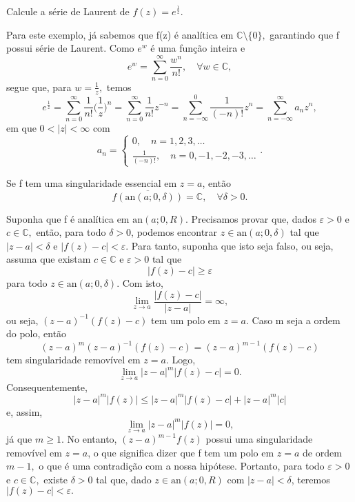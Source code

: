 \documentclass[ComplexAnalysis/complex.tex]{subfiles}
\begin{document}
\begin{example}
	Calcule a série de Laurent de \(f(z) = e^{\frac{1}{z}}.\)

	Para este exemplo, já sabemos que f(z) é analítica em \(\mathbb{C}\setminus{\{0\}},\) garantindo que f possui série de Laurent.
	Como \(e^{w}\) é uma função inteira e
	\[
		e^{w} = \sum\limits_{n=0}^{\infty}\frac{w^{n}}{n!},\quad \forall w\in \mathbb{C},
	\]
	segue que, para \(w = \frac{1}{z},\) temos
	\[
		e^{\frac{1}{z}}=\sum\limits_{n=0}^{\infty}\frac{1}{n!}\biggl(\frac{1}{z}\biggr)^{n} = \sum\limits_{n=0}^{\infty}\frac{1}{n!}z^{-n} = \sum\limits_{n=-\infty}^{0}\frac{1}{(-n)!}z^{n} = \sum\limits_{n=-\infty}^{\infty}a_{n}z^{n},
	\]
	em que \(0 < |z| < \infty\) com
	\[
		a_{n}  = \left\{\begin{array}{ll}
			0,\quad n=1, 2, 3,\dotsc \\
			\frac{1}{(-n)!},\quad n = 0, -1, -2, -3, \dotsc
		\end{array}\right. .
	\]
\end{example}
\hypertarget{casorati-weierstrass}{
	\begin{theorem*}
		Se f tem uma singularidade essencial em \(z=a\), então
		\[
			\overline{f(\mathrm{an}(a; 0, \delta ))} = \mathbb{C},\quad \forall \delta > 0.
		\]
	\end{theorem*}}
\begin{proof*}
	Suponha que f é analítica em \(\mathrm{an}(a; 0, R).\) Precisamos provar que, dados \(\varepsilon > 0\) e \(c\in \mathbb{C},\) então, para todo \(\delta >0\),
	podemos encontrar \(z\in \mathrm{an}(a; 0, \delta )\) tal que \(|z-a| < \delta \) e \(|f(z) - c| < \varepsilon .\) Para tanto, suponha que isto seja falso, ou seja, assuma que existam
	\(c\in \mathbb{C}\) e \(\varepsilon > 0\) tal que
	\[
		|f(z) - c| \geq \varepsilon
	\]
	para todo \(z\in \mathrm{an}(a; 0, \delta )\). Com isto,
	\[
		\lim_{z\to a}\frac{|f(z)-c|}{|z-a|} = \infty,
	\]
	ou seja, \((z-a)^{-1}(f(z)-c)\) tem um polo em \(z=a.\) Caso m seja a ordem do polo, então
	\[
		(z-a)^{m}(z-a)^{-1}(f(z)-c) = (z-a)^{m-1}(f(z)-c)
	\]
	tem singularidade removível em \(z=a.\) Logo,
	\[
		\lim_{z\to a}|z-a|^{m}|f(z)-c| = 0.
	\]
	Consequentemente,
	\[
		|z-a|^{m}|f(z)|\leq |z-a|^{m}|f(z)-c| + |z-a|^{m}|c|
	\]
	e, assim,
	\[
		\lim_{z\to a}|z-a|^{m}|f(z)| = 0,
	\]
	já que \(m\geq 1.\) No entanto, \((z-a)^{m-1}f(z)\) possui uma singularidade removível em \(z=a\), o que significa dizer que
	f tem um polo em \(z=a\) de ordem \(m-1,\) o que é uma contradição com a nossa hipótese. Portanto, para todo \(\varepsilon >0\) e \(c\in \mathbb{C},\)
	existe \(\delta > 0\) tal que, dado \(z\in \mathrm{an}(a; 0, R)\) com \(|z-a| < \delta \), teremos \(|f(z) - c| < \varepsilon .\) \qedsymbol
\end{proof*}
\end{document}
